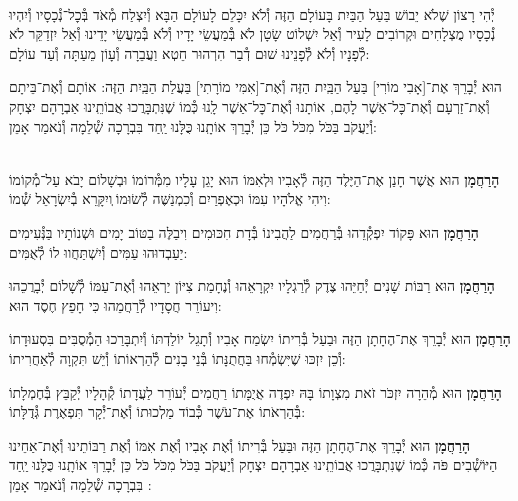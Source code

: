 \documentclass[twoside, openany, parskip=half, 11pt]{book}
\begin{document}
\begin{footnotesize}
\\
יְ֯הִי רָצוֹן שֶׁלֹא יֵבוֹשׁ בַּעַל הַבַּיִת בָּעוֹלָם הַזֶּה וְ֯לֹא יִכָּלֵם לָעוֹלָם הַבָּא וְ֯יִצְלַח מְ֯אֹד בְּ֯כׇל־נְ֯כָסָיו וְ֯יִהְיוּ נְ֯כָסָיו מֻצְלָחִים וּקְרוֹבִים לָעִיר וְ֯אַל יִשְׁלוֹט שָׂטָן לֹא בְּ֯מַעֲשֵׂי יָדָיו וְ֯לֹא בְּ֯מַעֲשֵׂי יָדֵינוּ וְ֯אַל יִזְדַקֵּר לֹא לְ֯פָנָיו וְ֯לֹא לְ֯פָנֵינוּ שׁוּם דְ֯בַר הִרְהוּר חֵטְא וַעֲבֵרָה וְ֯עָוֹן מֵעַתָּה וְ֯עַד עוֹלָם:

\end{footnotesize}

הוּא יְ֯בָרֵךְ אֶת־[אָבִי מוֹרִי] בַּעַל הַבַּֽיִת הַזֶּה וְ֯אֶת־[אִמִּי מוֹרָתִי] בַּעֲלַת הַבַּֽיִת הַזֶּה: אוֹתָם וְ֯אֶת־בֵּיתָם וְ֯אֶת־זַרְעָם וְ֯אֶת־כׇּל־אַשֶׁר לָהֶם, אוֹתָנוּ וְ֯אֶת־כׇּל־אַשֶׁר לָֽנוּ כְּ֯מוֹ שֶׁנִּתְבָּרֲכוּ אֲבוֹתֵֽינוּ אַבְרָהָם יִצְחָק וְ֯יַעֲקֹב בַּכֹּל מִכֹּל כֹּל כֵּן יְ֯בָרֵךְ אוֹתָֽנוּ כֻּלָּנוּ יַֽחַד בִּבְרָכָה שְׁ֯לֵמָה וְ֯נֹאמַר אָמֵן:

\begin{sometimes}

\\
\textbf{הָרַחֲמָן}
הוּא אֲשֶׁר חָנַן אֶת־הַיֶּלֶד הַזֶּה לְ֯אָבִיו וּלְאִמּוֹ הוּא יָגֵן עָלָיו מִמְּ֯רוֹמוֹ וּבְשָׁלוֹם יָבֹא עַל־מְ֯קוֹמוֹ וִיהִי אֱלֹהָיו עִמּוֹ וּכְאֶפְרַיִם וְ֯כִמְנַשֶּׁה לְ֯שׂוּמוֹ ְויִקָּרֵא בְ֯יִשְׂרָאֵל שְׁ֯מוֹ:

\textbf{הָרַחֲמָן}
הוּא פָּקוֹד יִפְקְ֯דֵהוּ בְּ֯רַחֲמִים לַהֲבִינוֹ בְּ֯דָת חִכּוּמִים וִיבַלֶּה בַטּוֹב יָמִים וּשְׁנוֹתָיו בַּנְּ֯עִימִים יַעַבְדוּהוּ עַמִּים וְ֯יִשְׁתַּחֲווּ לוֹ לְ֯אֻמִּים:

\textbf{הָרַחֲמָן}
הוּא רַבּוֹת שָׁנִים יְ֯חַיֵּהוּ צֶדֶק לְ֯רַגְלָיו יִקְרָאֵהוּ וְ֯נֶחָמַת צִיּוֹן יַרְאֵהוּ וְ֯אֶת־עַמּוֹ לְ֯שָׁלוֹם יְ֯בָרֲכֵהוּ וִיעוֹרֵר חֲסָדָיו לְ֯רַחֲמֵהוּ כִּי חָפֵץ חֶסֶד הוּא:

\textbf{הָרַחֲמָן}
הוּא יְ֯בָרֵךְ אֶת־הֶחָתָן הַזֶּה וּבַעַל בְּ֯רִיתוֹ יִשְׂמַח אָבִיו וְ֯תָגֵל יוֹלַדְתּוֹ וְ֯יִתְבָּרַכוּ הַמְ֯סֻבִּים בִּסְעוּדָתוֹ וְ֯כֵן יִזְכּוּ שֶׁיִּשְׂמְ֯חוּ בַּחֲתֻנָּתוֹ בְּ֯נֵי בָנִים לְ֯הַרְאוֹתוֹ וְ֯יֵשׁ תִּקְוָה לְ֯אַחֲרִיתוֹ:

\textbf{הָרַחֲמָן}
הוּא מְ֯הֵרָה יִזְכֹּר זֹאת מִצְוָתוֹ בָּהּ יִפְדֶה אֲיֻמָּתוֹ רַחֲמִים יְ֯עוֹרֵר לַעֲדָתוֹ קְ֯הָלָיו יְ֯קַבֵּץ בְּ֯חֶמְלָתוֹ בְּ֯הַרְאֹתוֹ אֶת־עֹשֶׁר כְּ֯בוֹד מַלְכוּתוֹ וְ֯אֶת־יְ֯קָר תִּפְאֶרֶת גְּ֯דֻלָּתוֹ:

\textbf{הָרַחֲמָן}
הוּא יְ֯בָרֵךְ אֶת־הֶחָתָן הַזֶּה וּבַּעַל בְּ֯רִיתוֹ וְ֯אֶת אָבִיו וְ֯אֶת אִמּוֹ וְ֯אֶת רַבּוֹתֵינוּ וְ֯אֶת־אַחֵינוּ הַיּוֹשְׁ֯בִים פֹּה כְּ֯מוֹ שֶׁנִתְבָּרֲכוּ אֲבוֹתֵֽינוּ אַבְרָהָם יִצְחָק וְ֯יַעֲקֹב בַּכֹּל מִכֹּל כֹּל כֵּן יְ֯בָרֵךְ אוֹתָֽנוּ כֻּלָּנוּ יַֽחַד בִּבְרָכָה שְׁ֯לֵמָה וְ֯נֹאמַר אָמֵן
:

\end{sometimes}
\end{document}
